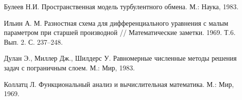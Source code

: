\documentclass[press]{vestnik}
\begin{document}
\begin{thebibliography}{12}
Булеев Н.И. Пространственная модель турбулентного обмена. М.: Наука, 1983. 

Ильин А. М. Разностная схема для дифференциального уравнения с малым параметром при старшей производной // Математические заметки. 1969. Т.6. Вып. 2. С. 237--248. 

Дулан Э., Миллер Дж., Шилдерс У. Равномерные численные методы решения задач с пограничным слоем. М.: Мир, 1983.

Коллатц Л. Функциональный анализ и вычислительная математика. М.: Мир, 1969. 
\end{thebibliography}
\end{document}
